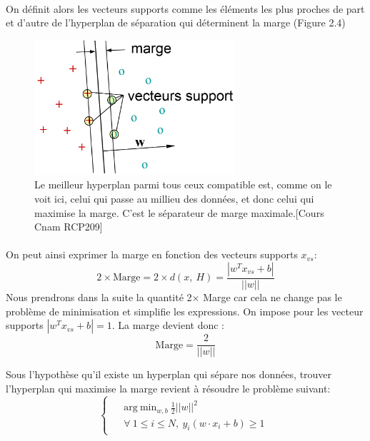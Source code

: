 \documentclass[a4paper,12pt,titlepage]{report}
\begin{document}
\paragraph{}
On définit alors les vecteurs supports comme les éléments les plus proches de part et d'autre de l'hyperplan de séparation qui déterminent la marge (Figure 2.4)
\begin{figure}[!h]
	\begin{center}
	\centering	
		\includegraphics[height =5cm, keepaspectratio]{graphes/svm07.png}
		\caption{Le meilleur hyperplan parmi tous ceux compatible est, comme on le voit ici, celui qui passe au \og millieu \fg des données, et donc celui qui maximise la marge. C’est le séparateur de marge maximale.[Cours Cnam RCP209]}
	\end{center}
\end{figure}
\paragraph{}
On peut ainsi exprimer la marge en fonction des vecteurs supports $x_{vs}$:
\[ 
2 \times \text{Marge} = 2 \times d(x,\ H) = \frac{|w^T x_{vs} + b|}{||w||}
\]
Nous prendrons dans la suite la quantité 2$\times$ Marge car cela ne change pas le problème de minimisation et simplifie les expressions. On impose pour les vecteur supports $|w^T x_{vs} + b| = 1$. La marge devient donc :
\[ \text{Marge} = \frac{2}{||w||} \]

Sous l'hypothèse qu'il existe un hyperplan qui sépare nos données, trouver l'hyperplan qui maximise la marge revient à résoudre le problème suivant:
\[
	\left\{
	\begin{array}{ccc}		
	\begin{aligned}
		&\text{arg}\ \text{min}_{w,b}\ \frac{1}{2}||w||^{2} \\
		&\forall \ 1 \leqslant i \leqslant N,\ y_i (w \cdot x_i + b)\geqslant 1
	\end{aligned}
\end{array}
	\right.
\]
\end{document}
